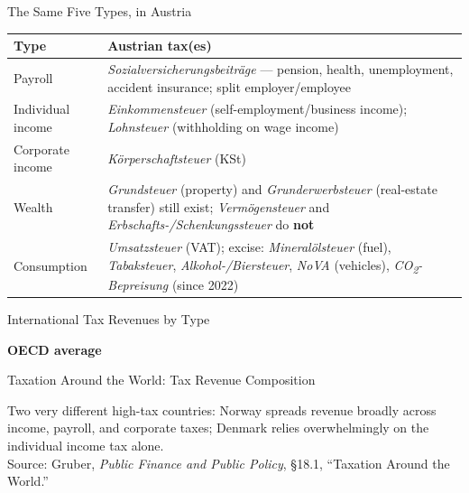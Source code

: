 \documentclass[11pt,aspectratio=169]{beamer}
\newcommand{\srcnote}[1]{{\footnotesize\color{wugray}Source: #1}}
\begin{document}
\begin{frame}{The Same Five Types, in Austria}
  \scriptsize
  \begin{center}
  \begin{tabular}{@{}p{2.6cm}p{9.3cm}@{}}
    \toprule
    \textbf{Type} & \textbf{Austrian tax(es)} \\
    \midrule
    Payroll & \emph{Sozialversicherungsbeiträge} --- pension, health, unemployment, accident insurance; split employer/employee \\[0.2em]
    Individual income & \emph{Einkommensteuer} (self-employment/business income); \emph{Lohnsteuer} (withholding on wage income) \\[0.2em]
    Corporate income & \emph{Körperschaftsteuer} (KSt) \\[0.2em]
    Wealth & \emph{Grundsteuer} (property) and \emph{Grunderwerbsteuer} (real-estate transfer) still exist; \emph{Vermögensteuer} and \emph{Erbschafts-/Schenkungssteuer} do \textbf{not} \\[0.2em]
    Consumption & \emph{Umsatzsteuer} (VAT); excise: \emph{Mineralölsteuer} (fuel), \emph{Tabaksteuer}, \emph{Alkohol-/Biersteuer}, \emph{NoVA} (vehicles), \emph{CO\textsubscript{2}-Bepreisung} (since 2022) \\
    \bottomrule
  \end{tabular}
  \end{center}
  \centering

\end{frame}

\begin{frame}{International Tax Revenues by Type}
\centering



		\textbf{OECD average}\\[0.2em]

\end{frame}

\begin{frame}{Taxation Around the World: Tax Revenue Composition}
  \begin{center}
  \end{center}
  \centering
  Two very different high-tax countries: Norway spreads revenue broadly across income, payroll, and corporate taxes; Denmark relies overwhelmingly on the individual income tax alone.\\
  \srcnote{Gruber, \emph{Public Finance and Public Policy}, \S18.1, ``Taxation Around the World.''}
\end{frame}
\end{document}
